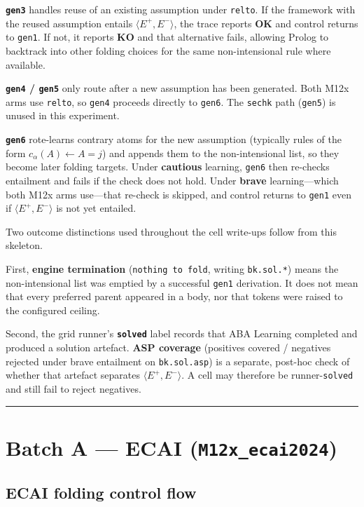 \documentclass[11pt]{article}
\begin{document}
\textbf{\texttt{gen3}} handles reuse of an existing assumption under \texttt{relto}. If the framework with the reused assumption entails \(\langle E^+,E^-\rangle\), the trace reports \textbf{OK} and control returns to \texttt{gen1}. If not, it reports \textbf{KO} and that alternative fails, allowing Prolog to backtrack into other folding choices for the same non-intensional rule where available.

\textbf{\texttt{gen4} / \texttt{gen5}} only route after a new assumption has been generated. Both M12x arms use \texttt{relto}, so \texttt{gen4} proceeds directly to \texttt{gen6}. The \texttt{sechk} path (\texttt{gen5}) is unused in this experiment.

\textbf{\texttt{gen6}} rote-learns contrary atoms for the new assumption (typically rules of the form \(c_\alpha(A) \leftarrow A=j\)) and appends them to the non-intensional list, so they become later folding targets. Under \textbf{cautious} learning, \texttt{gen6} then re-checks entailment and fails if the check does not hold. Under \textbf{brave} learning---which both M12x arms use---that re-check is skipped, and control returns to \texttt{gen1} even if \(\langle E^+,E^-\rangle\) is not yet entailed.

Two outcome distinctions used throughout the cell write-ups follow from this skeleton.

First, \textbf{engine termination} (\texttt{nothing to fold}, writing \texttt{bk.sol.*}) means the non-intensional list was emptied by a successful \texttt{gen1} derivation. It does not mean that every preferred parent appeared in a body, nor that tokens were raised to the configured ceiling.

Second, the grid runner's \textbf{\texttt{solved}} label records that ABA Learning completed and produced a solution artefact. \textbf{ASP coverage} (positives covered / negatives rejected under brave entailment on \texttt{bk.sol.asp}) is a separate, post-hoc check of whether that artefact separates \(\langle E^+,E^-\rangle\). A cell may therefore be runner-\texttt{solved} and still fail to reject negatives.

\medskip\hrule\medskip

\section{Batch A --- ECAI (\texttt{M12x\_ecai2024})}

\subsection{ECAI folding control flow}
\end{document}
